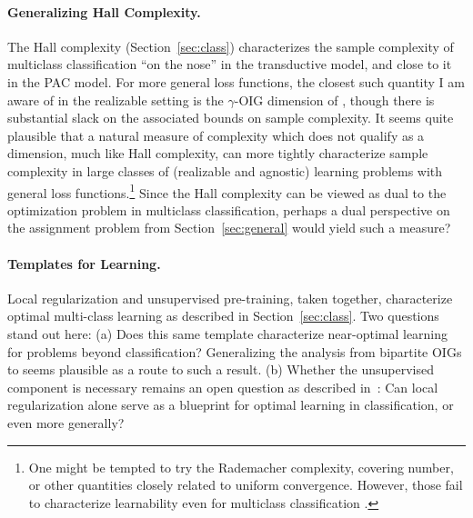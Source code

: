 \paragraph{Generalizing Hall Complexity.} The Hall complexity (Section~\ref{sec:class}) characterizes the sample complexity of multiclass classification ``on the nose'' in the transductive model, and close to it in the PAC model. For more general loss functions, the closest such quantity I am aware of in the realizable setting is the $\gamma$-OIG dimension of \citet{attias_optimal_2023}, though there is substantial slack on the associated bounds on sample complexity. It seems quite plausible that a natural measure of complexity which does not qualify as a dimension, much like Hall complexity, can more tightly characterize sample complexity in large classes of (realizable and agnostic) learning problems with general loss functions.\footnote{One might be tempted to try the Rademacher complexity, covering number, or other quantities closely related to uniform convergence. However, those fail to characterize learnability even for multiclass classification \cite{daniely_multiclass_2011}.} Since the Hall complexity can be viewed as dual to the optimization problem in multiclass classification, perhaps a dual perspective on the \fds assignment problem from Section~\ref{sec:general} would yield such a measure?

\paragraph{Templates for Learning.} Local regularization and unsupervised pre-training, taken together, characterize optimal multi-class learning as described in Section~\ref{sec:class}.  Two questions stand out here: (a) Does this same template characterize near-optimal learning for problems beyond classification? Generalizing the analysis from bipartite OIGs to \fdss seems plausible as a route to such a result.  (b) Whether the unsupervised component is necessary remains an open question as described in~\citet{asilis_open_2024}: Can local regularization alone serve as a blueprint for optimal learning in classification, or even more generally?

